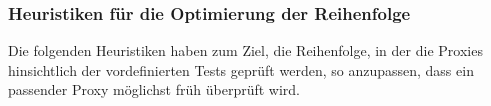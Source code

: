 \documentclass[a4paper,12pt]{article}
\begin{document}

\subsubsection{Heuristiken für die Optimierung der Reihenfolge}
Die folgenden Heuristiken haben zum Ziel, die Reihenfolge, in der die Proxies hinsichtlich der vordefinierten Tests geprüft werden, so anzupassen, dass ein passender Proxy möglichst früh überprüft wird.
\end{document}
